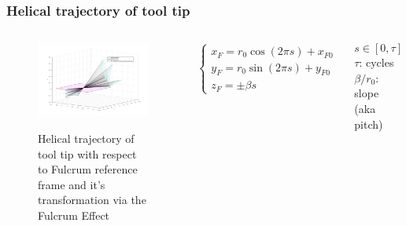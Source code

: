 \begin{frame}
\frametitle{Helical trajectory of tool tip}

\begin{columns}
\begin{center}
\begin{figure}[!htb]
\centering
\includegraphics[width=\textwidth]{../images/rcm_trajectories/rcm_helical_traj.png}\\
\caption{Helical trajectory of tool tip with respect to Fulcrum reference frame and it's transformation via the Fulcrum Effect}
\end{figure}
\end{center}

\[
\begin{cases}
x^{}_{F} = r_0\cos(2πs) + x^{}_{F0} \\
y^{}_{F} = r_0\sin(2πs) + y^{}_{F0} \\
z^{}_{F} = \pm βs
\end{cases}
\]
\begin{center}
\[
s \in \left[ 0, τ \right]
\]
$τ$: cycles\\
$β/r_0$: slope (aka pitch)
\end{center}
\end{columns}
\end{frame}


